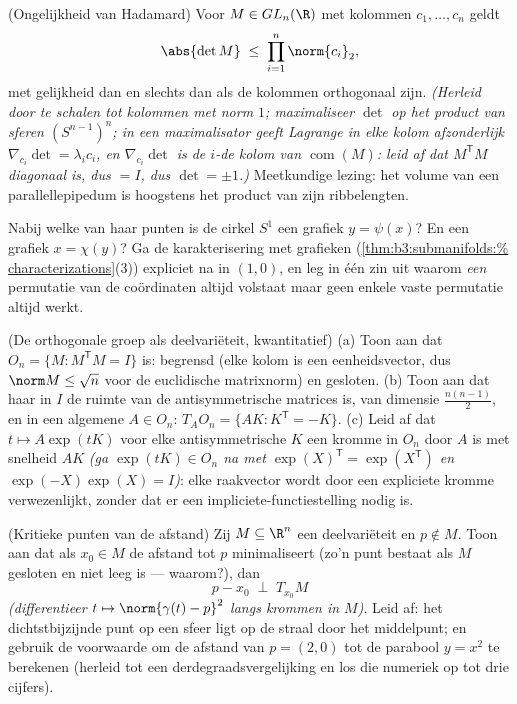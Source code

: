 \begin{exercise}[$\star\star\star$]\label{exo:b3:submanifolds:9}
(Ongelijkheid van Hadamard) Voor $M \in GL_n(\R)$ met kolommen
$c_1, \dots, c_n$ geldt
\[
\abs{\det M} \;\leq\; \prod_{i=1}^n\norm{c_i}_2 ,
\]
met gelijkheid dan en slechts dan als de kolommen orthogonaal
zijn. \emph{(Herleid door te schalen tot kolommen met norm $1$;
maximaliseer $\det$ op het  product van sferen
$(S^{n-1})^n$; in een maximalisator geeft Lagrange in elke kolom
afzonderlijk $\nabla_{c_i}\det = \lambda_ic_i$, en
$\nabla_{c_i}\det$ is de $i$-de kolom van
$\operatorname{com}(M)$: leid af dat $M^{\mathsf T}M$ diagonaal
is, dus $= I$, dus $\det = \pm1$.)} Meetkundige lezing: het
volume van een parallellepipedum is hoogstens het product van
zijn ribbelengten.
\end{exercise}

\begin{exercise}[$\star\star$]\label{exo:b3:submanifolds:10}
Nabij welke van haar punten is de cirkel $S^1$ een grafiek $y =
\psi(x)$? En een grafiek $x = \chi(y)$? Ga de karakterisering met
grafieken (\cref{thm:b3:submanifolds:%
characterizations}(3)) expliciet na in $(1, 0)$, en leg in één
zin uit waarom \emph{een} permutatie van de coördinaten altijd
volstaat maar geen enkele vaste permutatie altijd werkt.
\end{exercise}

\begin{exercise}[$\star\star$]\label{exo:b3:submanifolds:11}
(De orthogonale groep als deelvariëteit, kwantitatief)
(a) Toon aan dat $O_n = \{M : M^{\mathsf T}M = I\}$  is:
begrensd (elke kolom is een eenheidsvector, dus $\norm M \leq
\sqrt n$ voor de euclidische matrixnorm) en gesloten.
(b) Toon aan dat haar  in $I$ de ruimte van de
antisymmetrische matrices is, van dimensie $\frac{n(n-1)}2$, en
in een algemene $A \in O_n$: $T_AO_n = \{AK : K^{\mathsf T} =
-K\}$.
(c) Leid af dat $t \mapsto A\exp(tK)$ voor elke antisymmetrische
$K$ een kromme in $O_n$ door $A$ is met snelheid $AK$ \emph{(ga
$\exp(tK) \in O_n$ na met $\exp(X)^{\mathsf T} =
\exp(X^{\mathsf T})$ en $\exp(-X)\exp(X) = I$)}: elke raakvector
wordt door een expliciete kromme verwezenlijkt, zonder dat er een
impliciete-functiestelling nodig is.
\end{exercise}

\begin{exercise}[$\star\star$]\label{exo:b3:submanifolds:12}
(Kritieke punten van de afstand) Zij $M \subseteq \R^n$ een
deelvariëteit en $p \notin M$. Toon aan dat als $x_0 \in M$ de
afstand tot $p$ minimaliseert (zo'n punt bestaat als $M$ gesloten
en niet leeg is --- waarom?), dan
\[
p - x_0 \;\perp\; T_{x_0}M
\]
\emph{(differentieer $t \mapsto \norm{\gamma(t) - p}^2$ langs
krommen in $M$)}. Leid af: het dichtstbijzijnde punt op een sfeer
ligt op de straal door het middelpunt; en gebruik de voorwaarde
om de afstand van $p = (2, 0)$ tot de parabool $y = x^2$ te
berekenen (herleid tot een derdegraadsvergelijking en los die
numeriek op tot drie cijfers).
\end{exercise}

